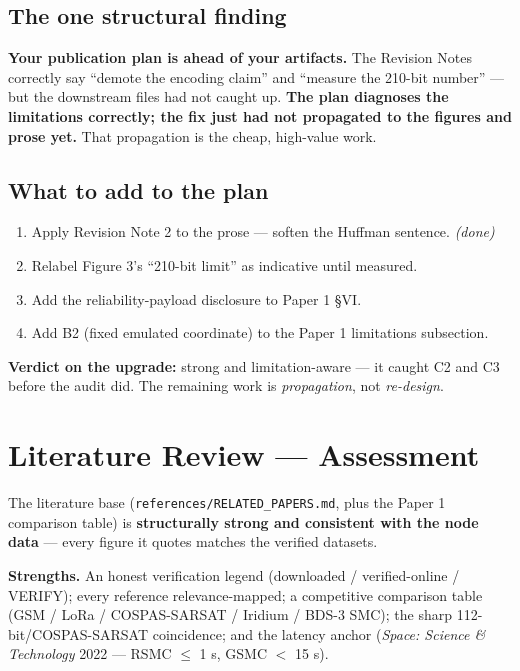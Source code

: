 \documentclass[11pt,a4paper]{article}
\begin{document}
\subsection{The one structural finding}
\textbf{Your publication plan is ahead of your artifacts.} The Revision Notes correctly say
``demote the encoding claim'' and ``measure the 210-bit number'' --- but the downstream files
had not caught up. \textbf{The plan diagnoses the limitations correctly; the fix just had not
propagated to the figures and prose yet.} That propagation is the cheap, high-value work.

\subsection{What to add to the plan}
\begin{enumerate}[leftmargin=1.6em,itemsep=1pt]
  \item Apply Revision Note 2 to the prose --- soften the Huffman sentence. \emph{(done)}
  \item Relabel Figure 3's ``210-bit limit'' as indicative until measured.
  \item Add the reliability-payload disclosure to Paper 1 \S VI.
  \item Add B2 (fixed emulated coordinate) to the Paper 1 limitations subsection.
\end{enumerate}

\textbf{Verdict on the upgrade:} strong and limitation-aware --- it caught C2 and C3 before
the audit did. The remaining work is \emph{propagation}, not \emph{re-design}.

\section{Literature Review --- Assessment}

The literature base (\texttt{references/RELATED\_PAPERS.md}, plus the Paper 1 comparison
table) is \textbf{structurally strong and consistent with the node data} --- every figure it
quotes matches the verified datasets.

\textbf{Strengths.} An honest verification legend (downloaded / verified-online / VERIFY);
every reference relevance-mapped; a competitive comparison table (GSM / LoRa /
COSPAS-SARSAT / Iridium / BDS-3 SMC); the sharp 112-bit/COSPAS-SARSAT coincidence; and the
latency anchor (\emph{Space: Science \& Technology} 2022 --- RSMC $\le$ 1 s, GSMC $<$ 15 s).
\end{document}

